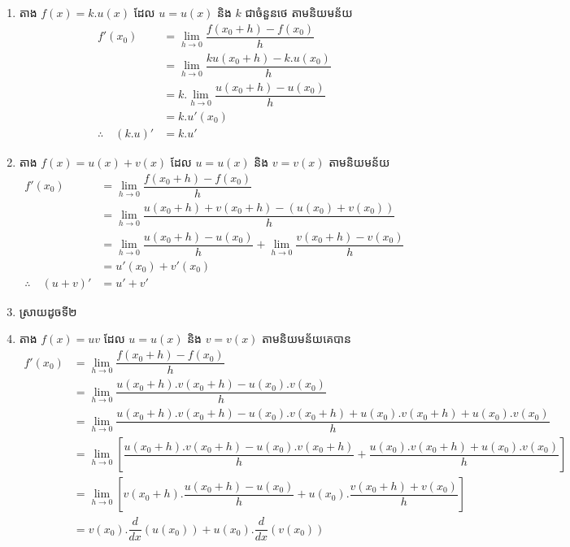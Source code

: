 \documentclass[a4paper,12pt]{article}
\begin{document}
\begin{enumerate} 
\item តាង $f(x)=k.u(x)$  ដែល $u=u(x)$ និង $k$ ជាចំនួនថេ តាមនិយមន័យ
 \begin{align*}
  f'(x_0)&=\lim_{h\to 0}\dfrac{f(x_0+h)-f(x_0)}{h}\\
 &=\lim_{h\to 0}\dfrac{ku(x_0+h)-k.u(x_0) }{h}\\
 &=k.\lim_{h\to 0}\dfrac{u(x_0+h)-u(x_0)}{h}\\
 &=k.u'(x_0)\\
 \therefore \quad (k.u)'&=k.u'
 \end{align*}
\item តាង $f(x)=u(x)+ v(x)$  ដែល $u=u(x)$ និង $v=v(x)$ តាមនិយមន័យ
 \begin{align*}
  f'(x_0)&=\lim_{h\to 0}\dfrac{f(x_0+h)-f(x_0)}{h}\\
 &=\lim_{h\to 0}\dfrac{u(x_0+h)+ v(x_0+h)-(u(x_0)+ v(x_0)) }{h}\\
 &=\lim_{h\to 0}\dfrac{u(x_0+h)-u(x_0)}{h}+\lim_{h\to 0}\dfrac{v(x_0+h)-v(x_0)}{h}\\
 &=u'(x_0)+v'(x_0)\\
 \therefore \quad (u+v)'&=u'+v'
 \end{align*}
 \item ស្រាយដូចទី២
 \item តាង $f(x)=uv$ ដែល $u=u(x)$ និង $v=v(x)$ តាមនិយមន័យគេបាន
 \begin{align*}
 f'(x_0)&=\lim_{h\to 0}\dfrac{f(x_0+h)-f(x_0)}{h}\\
 &=\lim_{h\to 0}\dfrac{u(x_0+h).v(x_0+h)-u(x_0).v(x_0)}{h}\\
 &=\lim_{h\to 0}\dfrac{u(x_0+h).v(x_0+h)-u(x_0).v(x_0+h)+u(x_0).v(x_0+h)+u(x_0).v(x_0)}{h}\\
 &=\lim_{h\to 0}\left[\dfrac{u(x_0+h).v(x_0+h)-u(x_0).v(x_0+h)}{h}+\dfrac{u(x_0).v(x_0+h)+u(x_0).v(x_0)}{h}\right]\\
  &=\lim_{h\to 0}\left[v(x_0+h).\dfrac{u(x_0+h)-u(x_0)}{h}+u(x_0).\dfrac{v(x_0+h)+v(x_0)}{h}\right]\\
  &=v(x_0).\dfrac{d}{dx}(u(x_0))+u(x_0).\dfrac{d}{dx}(v(x_0))\\
 \end{align*}


\end{enumerate}
\end{document}
